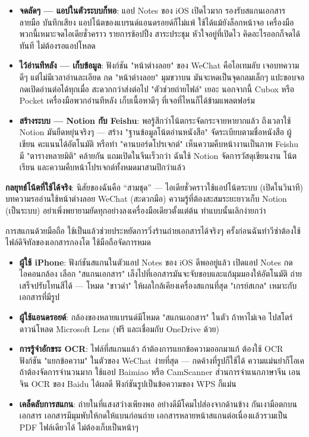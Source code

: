 \begin{itemize}
  \item \textbf{จดลัดๆ — แอปในตัวระบบก็พอ}: แอป Notes ของ iOS เปิดไวมาก รองรับสแกนเอกสาร ลายมือ บันทึกเสียง แอปโน้ตของแบรนด์แอนดรอยด์ก็ไม่แพ้ ใช้ได้แม้ยังล็อกหน้าจอ เครื่องมือพวกนี้เหมาะจดไอเดียชั่วคราว รายการช้อปปิ้ง สาระประชุม หัวใจอยู่ที่เปิดไว คิดอะไรออกก็จดได้ทันที ไม่ต้องรอแอปโหลด
  \item \textbf{ไว้อ่านทีหลัง — เก็บข้อมูล}: ฟังก์ชัน "หน้าต่างลอย" ของ WeChat คือไอเทมลับ เจอบทความดีๆ แต่ไม่มีเวลาอ่านละเอียด กด "หน้าต่างลอย" มุมขวาบน มันจะหดเป็นจุดกลมเล็กๆ แปะขอบจอ กดเปิดอ่านต่อได้ทุกเมื่อ สะดวกกว่าส่งต่อไป "ตัวช่วยถ่ายไฟล์" เยอะ นอกจากนี้ Cubox หรือ Pocket เครื่องมือพวกอ่านทีหลัง เก็บเนื้อหาดีๆ ที่เจอที่ไหนก็ได้ข้ามแพลตฟอร์ม
  \item \textbf{สร้างระบบ — Notion กับ Feishu}: พอรู้สึกว่าโน้ตกระจัดกระจายหายากแล้ว ถึงเวลาใช้ Notion มันยืดหยุ่นจริงๆ — สร้าง "ฐานข้อมูลโน้ตอ่านหนังสือ" จัดระเบียบตามชื่อหนังสือ ผู้เขียน คะแนนได้อัตโนมัติ หรือทำ "คานบอร์ดโปรเจกต์" เห็นความคืบหน้างานเป็นภาพ Feishu มี "ตารางหลายมิติ" คล้ายกัน แถมเปิดในจีนเร็วกว่า ฉันใช้ Notion จัดการวัสดุเขียนงาน โน้ตเรียน และความคืบหน้าโปรเจกต์ทั้งหมดมาสามปีกว่าแล้ว
\end{itemize}

\textbf{กลยุทธ์โน้ตที่ใช้ได้จริง}: นิสัยของฉันคือ “สามชุด” — ไอเดียชั่วคราวใช้แอปโน้ตระบบ (เปิดในวินาที) บทความรออ่านใช้หน้าต่างลอย WeChat (สะดวกมือ) ความรู้ที่ต้องสะสมระยะยาวเก็บ Notion (เป็นระบบ) อย่าเพิ่งพยายามยัดทุกอย่างลงเครื่องมือเดียวตั้งแต่ต้น ทำแบบนั้นเลิกง่ายกว่า


การสแกนด้วยมือถือ ใช้เป็นแล้วช่วยประหยัดการวิ่งร้านถ่ายเอกสารได้จริงๆ ครั้งก่อนฉันทำวีซ่าต้องใช้ไฟล์ดิจิทัลของเอกสารกองโต ใช้มือถือจัดการหมด

\begin{itemize}
  \item \textbf{ผู้ใช้ iPhone}: ฟังก์ชันสแกนในตัวแอป Notes ของ iOS ดีพออยู่แล้ว เปิดแอป Notes กดไอคอนกล้อง เลือก "สแกนเอกสาร" เล็งไปที่เอกสารมันจะจับขอบและแก้มุมมองให้อัตโนมัติ ถ่ายเสร็จปรับโทนสีได้ — โหมด "ขาวดำ" ให้ผลใกล้เคียงเครื่องสแกนที่สุด "เกรย์สเกล" เหมาะกับเอกสารที่มีรูป
  \item \textbf{ผู้ใช้แอนดรอยด์}: กล้องของหลายแบรนด์มีโหมด "สแกนเอกสาร" ในตัว ถ้าหาไม่เจอ ไปสโตร์ดาวน์โหลด Microsoft Lens (ฟรี และเชื่อมกับ OneDrive ด้วย)
  \item \textbf{การรู้จำอักขระ OCR}: ไฟล์ที่สแกนแล้ว ถ้าต้องการแยกข้อความออกมาแก้ ต้องใช้ OCR ฟังก์ชัน "แยกข้อความ" ในตัวของ WeChat ง่ายที่สุด — กดค้างที่รูปก็ใช้ได้ ความแม่นยำก็โอเค ถ้าต้องจัดการจำนวนมาก ใช้แอป Baimiao หรือ CamScanner ส่วนการจำแนกภาษาจีน เอนจิน OCR ของ Baidu ได้ผลดี ฟังก์ชันรูปเป็นข้อความของ WPS ก็แม่น
  \item \textbf{เคล็ดลับการสแกน}: ถ่ายในที่แสงสว่างเพียงพอ อย่างดีมีโคมไปส่องจากด้านข้าง กันเงามือตกบนเอกสาร เอกสารมีมุมพับให้กดให้แบนก่อนถ่าย เอกสารหลายหน้าสแกนต่อเนื่องแล้วรวมเป็น PDF ไฟล์เดียวได้ ไม่ต้องเก็บเป็นหน้าๆ
\end{itemize}

